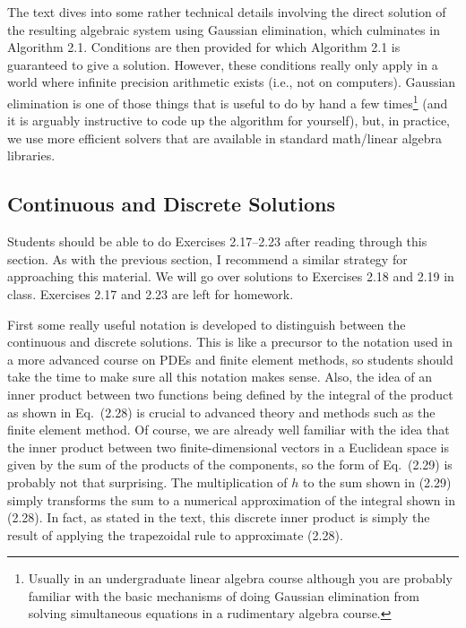 \documentclass{amsart}
\theoremstyle{plain}
\theoremstyle{definition}
\theoremstyle{remark}
\theoremstyle{definition}
\numberwithin{equation}{section}
\numberwithin{equation}{section}
\begin{document}
The text dives into some rather technical details involving the direct solution of the resulting algebraic system using Gaussian elimination, which culminates in Algorithm 2.1. 
Conditions are then provided for which Algorithm 2.1 is guaranteed to give a solution.
However, these conditions really only apply in a world where infinite precision arithmetic exists (i.e., not on computers). 
Gaussian elimination is one of those things that is useful to do by hand a few times\footnote{Usually in an undergraduate linear algebra course although you are probably familiar with the basic mechanisms of doing Gaussian elimination from solving simultaneous equations in a rudimentary algebra course.} (and it is arguably instructive to code up the algorithm for yourself), but, in practice, we use more efficient solvers that are available in standard math/linear algebra libraries. 




\subsection{Continuous and Discrete Solutions}

Students should be able to do Exercises 2.17--2.23 after reading through this section.
As with the previous section, I recommend a similar strategy for approaching this material.
We will go over solutions to Exercises 2.18 and 2.19 in class. 
Exercises 2.17 and 2.23 are left for homework. 


First some really useful notation is developed to distinguish between the continuous and discrete solutions.
This is like a precursor to the notation used in a more advanced course on PDEs and finite element methods, so students should take the time to make sure all this notation makes sense.
Also, the idea of an inner product between two functions being defined by the integral of the product as shown in Eq.~(2.28) is crucial to advanced theory and methods such as the finite element method.
Of course, we are already well familiar with the idea that the inner product between two finite-dimensional vectors in a Euclidean space is given by the sum of the products of the components, so the form of Eq.~(2.29) is probably not that surprising. 
The multiplication of $h$ to the sum shown in (2.29) simply transforms the sum to a numerical approximation of the integral shown in (2.28).
In fact, as stated in the text, this discrete inner product is simply the result of applying the trapezoidal rule to approximate (2.28). 
\end{document}
